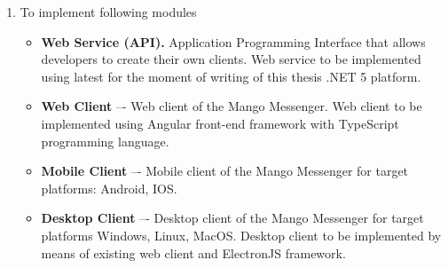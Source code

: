 \begin{enumerate}
    \item To implement following modules
    \begin{itemize}
        \item \textbf{Web Service (API).} Application Programming Interface that allows developers to create their own clients.
        Web service to be implemented using latest for the moment of writing of this thesis .NET 5 platform.
        \item \textbf{Web Client} –- Web client of the Mango Messenger.
        Web client to be implemented using Angular front-end framework with TypeScript programming language.
        \item \textbf{Mobile Client} –- Mobile client of the Mango Messenger for target platforms: Android, IOS\@.
        \item \textbf{Desktop Client} –- Desktop client of the Mango Messenger for target platforms Windows, Linux, MacOS\@.
        Desktop client to be implemented by means of existing web client and ElectronJS framework.
    \end{itemize}
\end{enumerate}